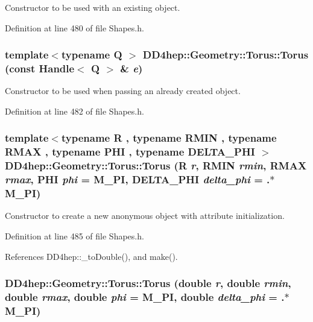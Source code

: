 Constructor to be used with an existing object. 

Definition at line 480 of file Shapes.h.\hypertarget{class_d_d4hep_1_1_geometry_1_1_torus_ac2a170ba695a63bc60e281fbc292b0bd}{
\subsubsection[{Torus}]{\setlength{\rightskip}{0pt plus 5cm}template$<$typename Q $>$ DD4hep::Geometry::Torus::Torus (const {\bf Handle}$<$ Q $>$ \& {\em e})}}
\label{class_d_d4hep_1_1_geometry_1_1_torus_ac2a170ba695a63bc60e281fbc292b0bd}


Constructor to be used when passing an already created object. 

Definition at line 482 of file Shapes.h.\hypertarget{class_d_d4hep_1_1_geometry_1_1_torus_aec91460f3c330cfeb2bf5548bde1fe31}{
\subsubsection[{Torus}]{\setlength{\rightskip}{0pt plus 5cm}template$<$typename R , typename RMIN , typename RMAX , typename PHI , typename DELTA\_\-PHI $>$ DD4hep::Geometry::Torus::Torus (R {\em r}, \/  RMIN {\em rmin}, \/  RMAX {\em rmax}, \/  PHI {\em phi} = {\ttfamily M\_\-PI}, \/  DELTA\_\-PHI {\em delta\_\-phi} = {.$\ast$M\_\-PI})}}
\label{class_d_d4hep_1_1_geometry_1_1_torus_aec91460f3c330cfeb2bf5548bde1fe31}


Constructor to create a new anonymous object with attribute initialization. 

Definition at line 485 of file Shapes.h.

References DD4hep::\_\-toDouble(), and make().\hypertarget{class_d_d4hep_1_1_geometry_1_1_torus_aafbe7786b4554751775d5038fcbf8d3a}{
\subsubsection[{Torus}]{\setlength{\rightskip}{0pt plus 5cm}DD4hep::Geometry::Torus::Torus (double {\em r}, \/  double {\em rmin}, \/  double {\em rmax}, \/  double {\em phi} = {\ttfamily M\_\-PI}, \/  double {\em delta\_\-phi} = {.$\ast$M\_\-PI})}}
\label{class_d_d4hep_1_1_geometry_1_1_torus_aafbe7786b4554751775d5038fcbf8d3a}


